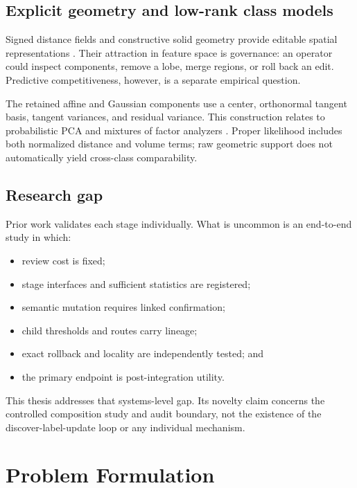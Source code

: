\documentclass[12pt,oneside]{report}
\begin{document}
\section{Explicit geometry and low-rank class models}

Signed distance fields and constructive solid geometry provide editable
spatial representations \cite{requicha1980,park2019}. Their attraction in
feature space is governance: an operator could inspect components, remove a
lobe, merge regions, or roll back an edit. Predictive competitiveness,
however, is a separate empirical question.

The retained affine and Gaussian components use a center, orthonormal tangent
basis, tangent variances, and residual variance. This construction relates to
probabilistic PCA and mixtures of factor analyzers
\cite{tipping1999,ghahramani1996}. Proper likelihood includes both normalized
distance and volume terms; raw geometric support does not automatically yield
cross-class comparability.

\section{Research gap}

Prior work validates each stage individually. What is uncommon is an
end-to-end study in which:

\begin{itemize}
\item review cost is fixed;
\item stage interfaces and sufficient statistics are registered;
\item semantic mutation requires linked confirmation;
\item child thresholds and routes carry lineage;
\item exact rollback and locality are independently tested; and
\item the primary endpoint is post-integration utility.
\end{itemize}

This thesis addresses that systems-level gap. Its novelty claim concerns the
controlled composition study and audit boundary, not the existence of the
discover-label-update loop or any individual mechanism.

\chapter{Problem Formulation}
\end{document}
